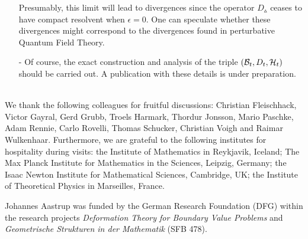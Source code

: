 \documentclass[12pt]{article}
\def\e{\epsilon}
\def\cb{{\cal B}}
\def\ch{{\cal H}}
\begin{document}
\begin{itemize}
Presumably, this limit will lead to divergences since the operator $D_{\smalltriangleup}$ ceases to have compact resolvent when $\e=0$. One can speculate whether these divergences might correspond to the divergences found in perturbative Quantum Field Theory.
\item[-]
Of course, the exact construction and analysis of the triple $(\cb_t,D_t,\ch_t)$ should be carried out. A publication with these details is under preparation.\\[3ex]
\end{itemize}


\\

We thank the following colleagues for fruitful discussions: Christian Fleischhack, Victor Gayral, Gerd Grubb, Troels Harmark, Thordur Jonsson, Mario Paschke, Adam Rennie, Carlo Rovelli, Thomas Schucker, Christian Voigh and Raimar Wulkenhaar. Furthermore, we are grateful to the following institutes for hospitality during visits: the Institute of Mathematics in Reykjavik, Iceland; The Max Planck Institute for Mathematics in the Sciences, Leipzig, Germany; the Isaac Newton Institute for Mathematical Sciences, Cambridge, UK; the Institute of Theoretical Physics in Marseilles, France.

Johannes Aastrup was  funded by the German Research Foundation (DFG) within the research projects  {\it Deformation Theory for Boundary Value Problems} and {\it Geometrische Strukturen in der Mathematik} (SFB 478). 










\appendix
\end{document}
